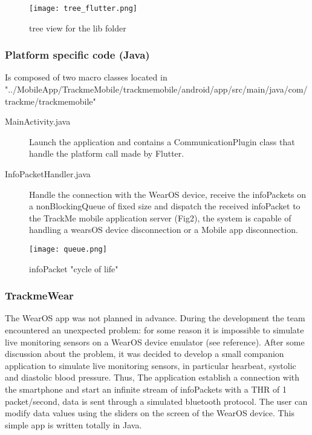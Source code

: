 \documentclass[../main.tex]{subfiles}
\begin{document}
	\begin{figure}[H]
		\centering
		\texttt{[image: tree\_flutter.png]}
		\caption{tree view for the lib folder}
		\label{fig:lib_tree.png}
	\end{figure}

\subsubsection{Platform specific code (Java)}
Is composed of two macro classes located in \\ "../MobileApp/TrackmeMobile/trackmemobile/android/app/src/main/java/com/trackme/trackmemobile"
\begin{description}
	\item[MainActivity.java] Launch the application and contains a CommunicationPlugin class that handle the platform call made by Flutter.
	\item[InfoPacketHandler.java] Handle the connection with the WearOS device, receive the infoPackets on a nonBlockingQueue of fixed size
	 and dispatch the received infoPacket to the TrackMe mobile application server (Fig2), the system is capable of handling a wearsOS device disconnection
	 or a Mobile app disconnection.
\end{description}

\begin{figure}[H]
	\centering
	\texttt{[image: queue.png]}
	\caption{infoPacket "cycle of life"}
	\label{fig:infopacketscycle.png}
\end{figure}

\subsubsection{TrackmeWear}
The WearOS app was not planned in advance. During the development the team encountered an unexpected problem: for some reason it is impossible to simulate live monitoring sensors on a WearOS device emulator (see reference).
After some discussion about the problem, it was decided to develop a small companion application to simulate live monitoring sensors, in particular hearbeat, systolic and diastolic blood pressure.
Thus, The application establish a connection with the smartphone and start an infinite stream of infoPackets with a THR of 1 packet/second, data is sent through a simulated bluetooth protocol. The user can modify data values using the sliders on the screen of the
WearOS device. This simple app is written totally in Java.
\end{document}
